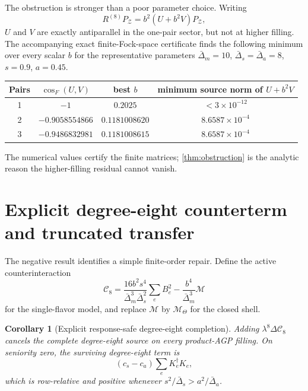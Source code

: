 \documentclass[11pt]{article}
\newtheorem{corollary}[theorem]{Corollary}
\theoremstyle{definition}
\theoremstyle{remark}
\newcommand{\cC}{\mathcal C}
\newcommand{\cZ}{\mathcal Z}
\newcommand{\cM}{\mathcal M}
\begin{document}
The obstruction is stronger than a poor parameter choice.  Writing
\begin{equation}
 R^{(8)}P_{\cZ}=b^2(U+b^2V)P_{\cZ},
 \label{eq:UV}
\end{equation}
$U$ and $V$ are exactly antiparallel in the one-pair sector, but not at higher filling.  The accompanying exact finite-Fock-space certificate finds the following minimum over every scalar $b$ for the representative parameters $\bar\Delta_m=10$, $\bar\Delta_s=\bar\Delta_a=8$, $s=0.9$, $a=0.45$.

\begin{center}
\begin{tabular}{@{}cccc@{}}
\toprule
Pairs & $\cos_F(U,V)$ & best $b$ & minimum source norm of $U+b^2V$\\
\midrule
1 & $-1$ & $0.2025$ & $<3\times10^{-12}$\\
2 & $-0.9058554866$ & $0.1181008620$ & $8.6587\times10^{-4}$\\
3 & $-0.9486832981$ & $0.1181008615$ & $8.6587\times10^{-4}$\\
\bottomrule
\end{tabular}
\end{center}
The numerical values certify the finite matrices; \cref{thm:obstruction} is the analytic reason the higher-filling residual cannot vanish.

\section{Explicit degree-eight counterterm and truncated transfer}\label{sec:C8}

The negative result identifies a simple finite-order repair.  Define the active counterinteraction
\begin{equation}
 \cC_8=
 \frac{16b^2s^4}{\bar\Delta_m^3\bar\Delta_s^2}\sum_eB_e^2
 -\frac{b^4}{\bar\Delta_m^3}\cM
 \label{eq:C8}
\end{equation}
for the single-flavor model, and replace $\cM$ by $\cM_\Theta$ for the closed shell.

\begin{corollary}[Explicit response-safe degree-eight completion]
\label{cor:C8}
Adding $\lambda^8\Delta\cC_8$ cancels the complete degree-eight source on every product-AGP filling.  On seniority zero, the surviving degree-eight term is
\begin{equation}
 (c_s-c_a)\sum_eK_e^\dagger K_e,
 \label{eq:safe-K-shift}
\end{equation}
which is row-relative and positive whenever
$s^2/\bar\Delta_s>a^2/\bar\Delta_a$.
\end{corollary}
\end{document}
